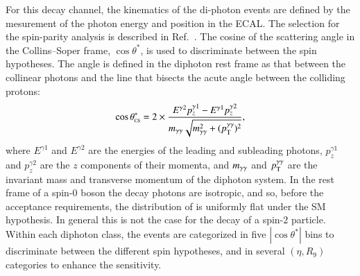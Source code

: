 For this decay channel, the kinematics of the di-photon events are
defined by the mesurement of the photon energy and position in the
ECAL. The selection for the spin-parity analysis is described in
Ref.~\cite{Khachatryan:2014ira}. The cosine of the scattering angle in
the Collins--Soper frame, $\cos\theta^*$, is used to discriminate
between the spin hypotheses.  The angle is defined in the diphoton
rest frame as that between the collinear photons and the line that
bisects the acute angle between the colliding protons:
%
\begin{equation}
  \cos\theta^{\ast}_{\mbox{\tiny{CS}}}=2\times\frac{E^{\gamma2}p^{\gamma1}_{z}-E^{\gamma1}p^{\gamma2}_{z}}{m_{\gamma\gamma}\sqrt{m_{\gamma\gamma}^{2}+(p_{\mathrm{T}}^{\gamma\gamma})^{2}}},
\end{equation}
%
where $E^{\gamma1}$ and $E^{\gamma2}$ are the energies of the leading
and subleading photons, $p^{\gamma1}_{z}$ and $p^{\gamma2}_{z}$ are
the $z$ components of their momenta, and $m_{\gamma\gamma}$ and $p_{\mathrm{T}}^{\gamma\gamma}$ are the
invariant mass and transverse momentum of the diphoton system.  In the
rest frame of a spin-0 boson the decay photons are isotropic, and so,
before the acceptance requirements, the distribution of \costhetastar
is uniformly flat under the SM hypothesis.  In general this is not
the case for the decay of a spin-2 particle.  Within each diphoton
class, the events are categorized in five $|\cos\theta^*|$ bins to
discriminate between the different spin hypotheses, and in several
$(\eta, R_9)$ categories to enhance the sensitivity.
%

